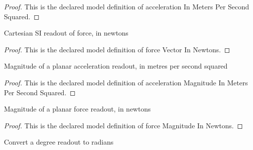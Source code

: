 \begin{proof}
  This is the declared model definition of acceleration In Meters Per Second Squared.
\end{proof}
\begin{definition}
  \label{def:physics:phyx-mini-0760:phyxminiproblems-problemphyxmini0760-forcevectorinnewtons}
  Cartesian SI readout of force, in newtons
\end{definition}
\begin{proof}
  This is the declared model definition of force Vector In Newtons.
\end{proof}
\begin{definition}
  \label{def:physics:phyx-mini-0760:phyxminiproblems-problemphyxmini0760-accelerationmagnitudeinmeterspersecondsquared}
  Magnitude of a planar acceleration readout, in metres per second squared
\end{definition}
\begin{proof}
  This is the declared model definition of acceleration Magnitude In Meters Per Second Squared.
\end{proof}
\begin{definition}
  \label{def:physics:phyx-mini-0760:phyxminiproblems-problemphyxmini0760-forcemagnitudeinnewtons}
  Magnitude of a planar force readout, in newtons
\end{definition}
\begin{proof}
  This is the declared model definition of force Magnitude In Newtons.
\end{proof}
\begin{definition}
  \label{def:physics:phyx-mini-0760:phyxminiproblems-problemphyxmini0760-degreestoradians}
  Convert a degree readout to radians
\end{definition}

